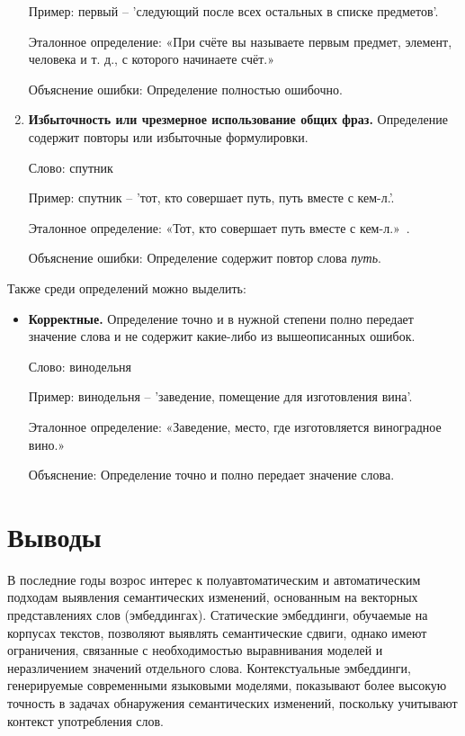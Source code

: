 \documentclass[LI,VKR]{HSEUniversity}
\begin{document}
\begin{enumerate}
   Пример: первый – ’следующий после всех остальных в списке предметов’.

   Эталонное определение: «При счёте вы называете первым предмет, элемент, человека и т. д., с которого начинаете счёт.»~\cite{TolkovyDmitriev}

   Объяснение ошибки: Определение полностью ошибочно.

%
%
%

\item \textbf{Избыточность или чрезмерное использование общих фраз.} Определение содержит повторы или избыточные формулировки.

%
%
%

   Слово: спутник

   Пример: спутник – ’тот, кто совершает путь, путь вместе с кем-л.’.

   Эталонное определение: «Тот, кто совершает путь вместе с кем-л.»~\cite{TolkovyKuznetsov}.

   Объяснение ошибки: Определение содержит повтор слова \textit{путь}.

\end{enumerate}

Также среди определений можно выделить:
\begin{itemize}
\item \textbf{Корректные.} Определение точно и в нужной степени полно передает значение слова и не содержит какие-либо из вышеописанных ошибок.

   Слово: винодельня

   Пример: винодельня – ’заведение, помещение для изготовления вина’.

   Эталонное определение: «Заведение, место, где изготовляется виноградное вино.»~\cite{ushakov1940}

   Объяснение: Определение точно и полно передает значение слова.
\end{itemize}

\section*{Выводы}

В последние годы возрос интерес к полуавтоматическим
и автоматическим подходам выявления семантических изменений,
основанным на векторных представлениях слов (эмбеддингах).
Статические эмбеддинги, обучаемые на корпусах текстов, позволяют выявлять семантические сдвиги,
однако имеют ограничения, связанные с необходимостью выравнивания моделей и неразличением значений
отдельного слова.
Контекстуальные эмбеддинги, генерируемые современными языковыми моделями,
показывают более высокую точность в задачах обнаружения семантических изменений,
поскольку учитывают контекст употребления слов.
\end{document}
